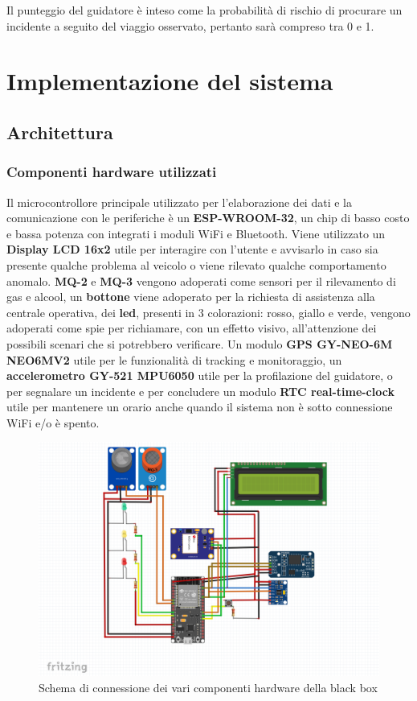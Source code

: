 \documentclass[12pt, a4paper, italian]{report}
\numberwithin{figure}{chapter}
\numberwithin{table}{chapter}
\begin{document}
Il punteggio del guidatore è inteso come la probabilità di rischio di procurare un incidente a seguito del viaggio osservato, pertanto sarà compreso tra 0 e 1.

\chapter{Implementazione del sistema}
\section{Architettura}

\subsection{Componenti hardware utilizzati}

Il microcontrollore principale utilizzato per l'elaborazione dei dati e la comunicazione con le periferiche è un \textbf{ESP-WROOM-32}, un chip di basso costo e bassa potenza con integrati i moduli WiFi e Bluetooth. 
Viene utilizzato un \textbf{Display LCD 16x2} utile per interagire con l'utente e avvisarlo in caso sia presente qualche problema al veicolo o viene rilevato qualche comportamento anomalo. \textbf{MQ-2} e \textbf{MQ-3} vengono adoperati come sensori per il rilevamento di gas e alcool, un \textbf{bottone} viene adoperato per la richiesta di assistenza alla centrale operativa, dei \textbf{led}, presenti in 3 colorazioni: rosso, giallo e verde, vengono adoperati come spie per richiamare, con un effetto visivo, all'attenzione dei possibili scenari che si potrebbero verificare. 
Un modulo \textbf{GPS GY-NEO-6M NEO6MV2} utile per le funzionalità di tracking e monitoraggio, un \textbf{accelerometro GY-521 MPU6050} utile per la profilazione del guidatore, o per segnalare un incidente e per concludere un modulo \textbf{RTC real-time-clock} utile per mantenere un orario anche quando il sistema non è sotto connessione WiFi e/o è spento.

\begin{figure}[h]
  \centering
  \includegraphics[width=12cm]{circuito_logo.png}
  \caption{Schema di connessione dei vari componenti hardware della black box}
  \label{fig:schemaCircuito}
\end{figure}
\end{document}
